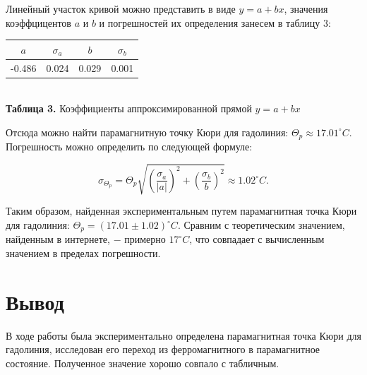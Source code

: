 \documentclass[a4paper,12pt]{article} %
\begin{document}
\hfill \break Линейный участок кривой можно представить в виде $y = a + bx$, значения коэффцицентов $a$ и $b$ и погрешностей их определения занесем в таблицу 3:

\begin{center}
\begin{tabular}{|c|c|c|c|}\hline
$ a $ & $ \sigma_{a} $ & $ b $ & $ \sigma_{b} $ \\\hline
-0.486 & 0.024 & 0.029 & 0.001 \\\hline
\end{tabular} \\
\hfill \break \textbf {Таблица 3.} Коэффициенты аппроксимированной прямой $y = a + bx$\\
\end{center}

\hfill \break Отсюда можно найти парамагнитную точку Кюри для гадолиния: $\Theta_{p} \approx 17.01^\circ C$. Погрешность можно определить по следующей формуле:

$$
\sigma_{\Theta_{p}} = \Theta_{p} \sqrt{\left( \frac{\sigma_{a}}{|a|} \right)^2 + \left( \frac{\sigma_{b}}{b} \right)^2} \approx 1.02^\circ C.
$$

\hfill \break Таким образом, найденная экспериментальным путем парамагнитная точка Кюри для гадолиния: $\Theta_{p} = (17.01 \pm 1.02)^\circ C$. Сравним с теоретическим значением, найденным в интернете, $-$ примерно $17^\circ C$, что совпадает с вычисленным значением в пределах погрешности.

\section{Вывод}
\hfill \break В ходе работы была экспериментально определена парамагнитная точка Кюри для гадолиния, исследован его переход из ферромагнитного в парамагнитное состояние. Полученное значение хорошо совпало с табличным.
\end{document}
